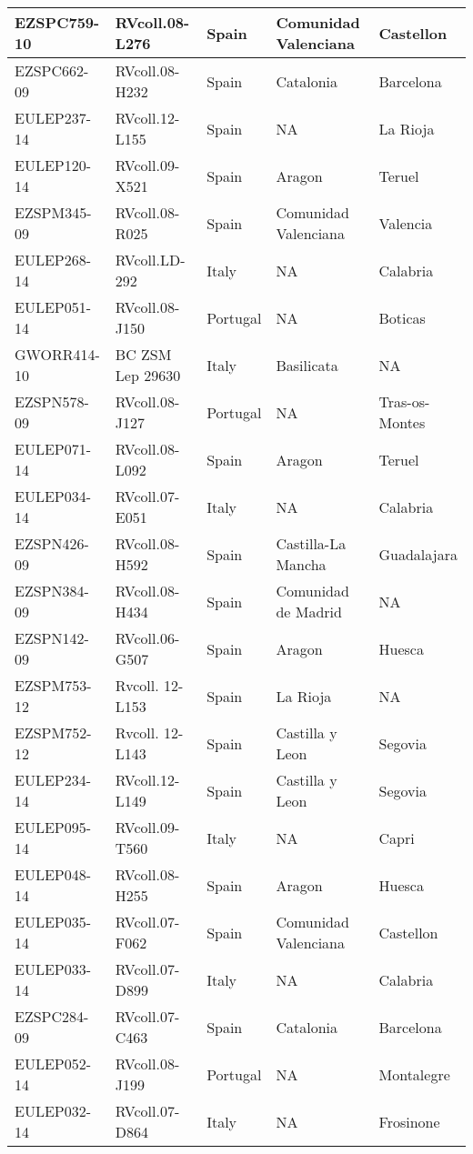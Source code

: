 \documentclass[12pt,]{article}
\begin{document}
\begin{landscape}
\begin{longtable}{l|l|l|l|l}
\hline
EZSPC759-10 & RVcoll.08-L276 & Spain & Comunidad Valenciana & Castellon\\
\hline
EZSPC662-09 & RVcoll.08-H232 & Spain & Catalonia & Barcelona\\
\hline
EULEP237-14 & RVcoll.12-L155 & Spain & NA & La Rioja\\
\hline
EULEP120-14 & RVcoll.09-X521 & Spain & Aragon & Teruel\\
\hline
EZSPM345-09 & RVcoll.08-R025 & Spain & Comunidad Valenciana & Valencia\\
\hline
EULEP268-14 & RVcoll.LD-292 & Italy & NA & Calabria\\
\hline
EULEP051-14 & RVcoll.08-J150 & Portugal & NA & Boticas\\
\hline
GWORR414-10 & BC ZSM Lep 29630 & Italy & Basilicata & NA\\
\hline
EZSPN578-09 & RVcoll.08-J127 & Portugal & NA & Tras-os-Montes\\
\hline
EULEP071-14 & RVcoll.08-L092 & Spain & Aragon & Teruel\\
\hline
EULEP034-14 & RVcoll.07-E051 & Italy & NA & Calabria\\
\hline
EZSPN426-09 & RVcoll.08-H592 & Spain & Castilla-La Mancha & Guadalajara\\
\hline
EZSPN384-09 & RVcoll.08-H434 & Spain & Comunidad de Madrid & NA\\
\hline
EZSPN142-09 & RVcoll.06-G507 & Spain & Aragon & Huesca\\
\hline
EZSPM753-12 & Rvcoll. 12-L153 & Spain & La Rioja & NA\\
\hline
EZSPM752-12 & Rvcoll. 12-L143 & Spain & Castilla y Leon & Segovia\\
\hline
EULEP234-14 & RVcoll.12-L149 & Spain & Castilla y Leon & Segovia\\
\hline
EULEP095-14 & RVcoll.09-T560 & Italy & NA & Capri\\
\hline
EULEP048-14 & RVcoll.08-H255 & Spain & Aragon & Huesca\\
\hline
EULEP035-14 & RVcoll.07-F062 & Spain & Comunidad Valenciana & Castellon\\
\hline
EULEP033-14 & RVcoll.07-D899 & Italy & NA & Calabria\\
\hline
EZSPC284-09 & RVcoll.07-C463 & Spain & Catalonia & Barcelona\\
\hline
EULEP052-14 & RVcoll.08-J199 & Portugal & NA & Montalegre\\
\hline
EULEP032-14 & RVcoll.07-D864 & Italy & NA & Frosinone\\

\end{longtable}
\end{landscape}
\end{document}
